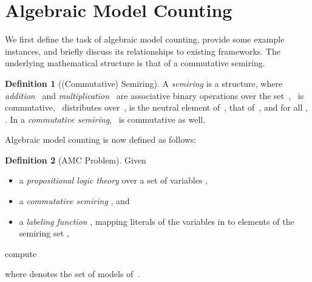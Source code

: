 \documentclass{article}
\theoremstyle{plain}
\theoremstyle{definition}
\newtheorem{definition}{Definition}
\begin{document}
\section{Algebraic Model Counting}\label{sec:amc}
We first define the task of algebraic model counting, provide some example
instances, and briefly discuss
its relationships to existing frameworks. The underlying mathematical structure is that of a
commutative semiring. 
\begin{definition}[(Commutative) Semiring]
A \emph{semiring} is a structure\linebreak[4] , where \emph{addition}~ and
\emph{multiplication}~ are associative binary operations over
the set~, ~is commutative, ~distributes
over~,  is the neutral element of~,  that of~,
and for all , . In a \emph{commutative semiring}, ~is
commutative as well.
\end{definition}
Algebraic model counting is now defined as follows:
\begin{definition}[AMC Problem]
Given
\begin{itemize}
  \item a \emph{propositional logic theory}  over a set of
    variables , 
  \item a \emph{commutative semiring} , and 
 \item a \emph{labeling function} , mapping literals  of the variables in  to elements of the semiring set , 
\end{itemize}
compute

where  denotes the set of models of~.
\end{definition}
\end{document}
